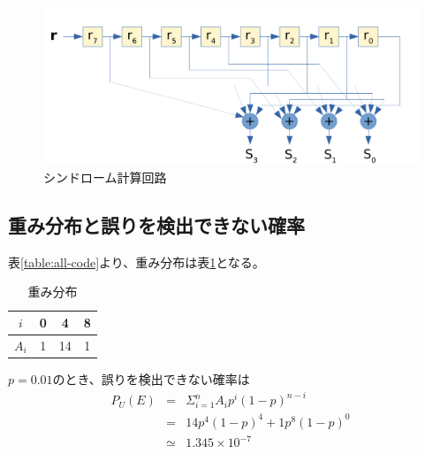 \documentclass[a4paper,11pt]{jsarticle}
\begin{document}
\begin{figure}[htbp]
  \begin{center}
  \includegraphics[scale=0.7]{figures/calc_syndrome001.pdf}
  \end{center}
  \caption{シンドローム計算回路
  \label{fig:calc-syndrome}
  }
\end{figure}

\subsection{重み分布と誤りを検出できない確率}
表\ref{table:all-code}より、重み分布は表\ref{table:weight-dist}となる。

\begin{table}[hbtp]
  \caption{重み分布}
  \label{table:weight-dist}
  \centering
  \begin{tabular}{|c|ccc|}
    \hline
    $i$ & 0 & 4 & 8 \\ \hline
    $A_i$ & 1 & 14 & 1 \\ \hline
  \end{tabular}
\end{table}

$p=0.01$のとき、誤りを検出できない確率は
\begin{eqnarray*}
  P_U(E) &=& \Sigma_{i=1}^{n}{A_ip^i(1-p)^{n-i}} \\
  &=& 14p^4(1-p)^4+1p^8(1-p)^0 \\
  &\simeq& 1.345 \times 10^{-7}
\end{eqnarray*}
\end{document}
